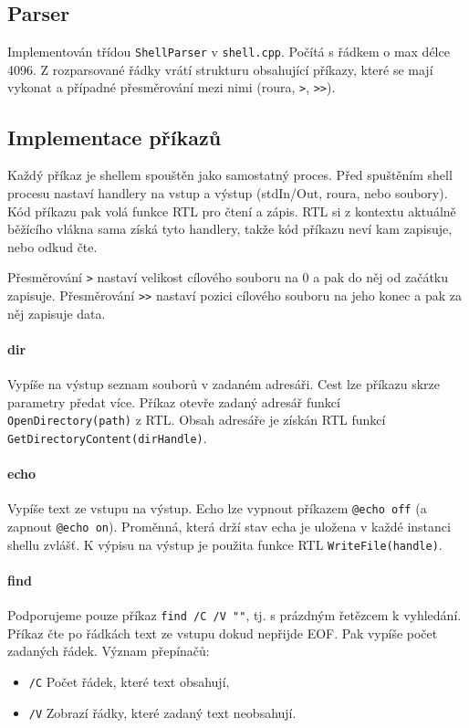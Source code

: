\documentclass[11pt,a4paper]{scrartcl}
\begin{document}
	\subsection{Parser}
	Implementován třídou \verb|ShellParser| v \verb|shell.cpp|. Počítá s řádkem o max délce 4096. Z rozparsované řádky vrátí strukturu obsahující příkazy, které se mají vykonat a případné přesměrování mezi nimi (roura, \verb|>|, \verb|>>|).
	
	\subsection{Implementace příkazů}
	Každý příkaz je shellem spouštěn jako samostatný proces. Před spuštěním shell procesu nastaví handlery na vstup a výstup (stdIn/Out, roura, nebo soubory). Kód příkazu pak volá funkce RTL pro čtení a zápis. RTL si z kontextu aktuálně běžícího vlákna sama získá tyto handlery, takže kód příkazu neví kam zapisuje, nebo odkud čte.
	
	Přesměrování \verb|>| nastaví velikost cílového souboru na 0 a pak do něj od začátku zapisuje. Přesměrování \verb|>>| nastaví pozici cílového souboru na jeho konec a pak za něj zapisuje data.
	
	\paragraph{dir}
	Vypíše na výstup seznam souborů v zadaném adresáři. Cest lze příkazu skrze parametry předat více. Příkaz otevře zadaný adresář funkcí \verb|OpenDirectory(path)| z RTL. Obsah adresáře je získán RTL funkcí \verb|GetDirectoryContent(dirHandle)|.
	
	\paragraph{echo}
	Vypíše text ze vstupu na výstup. Echo lze vypnout příkazem \verb|@echo off| (a zapnout \verb|@echo on|). Proměnná, která drží stav echa je uložena v každé instanci shellu zvlášť. K výpisu na výstup je použita funkce RTL \verb|WriteFile(handle)|.
	
	\paragraph{find}
	Podporujeme pouze příkaz \verb|find /C /V ""|, tj. s prázdným řetězcem k vyhledání. Příkaz čte po řádkách text
	ze vstupu dokud nepřijde EOF. Pak vypíše počet zadaných řádek.
	Význam přepínačů: 
	\begin{itemize}
		\item  \verb|/C| Počet řádek, které text obsahují,
		\item \verb|/V| Zobrazí řádky, které zadaný text neobsahují.
	\end{itemize}
	
\end{document}

